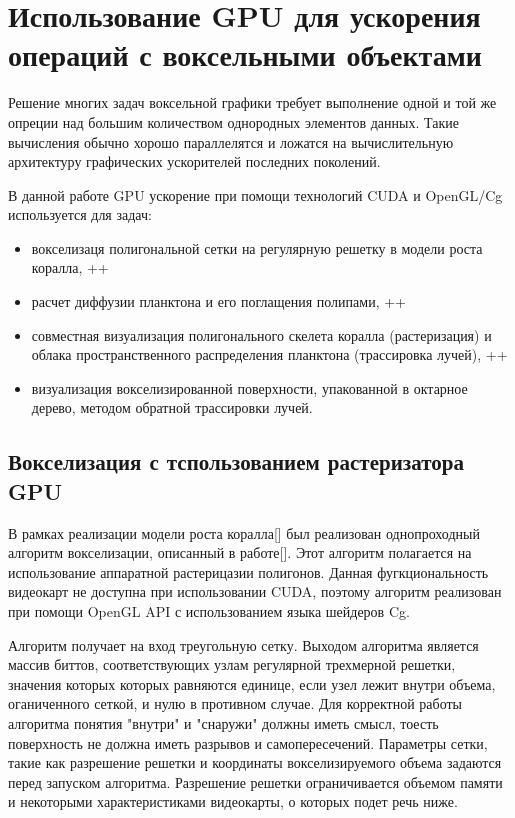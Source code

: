\section{Использование GPU для ускорения операций с воксельными объектами}

Решение многих задач воксельной графики требует выполнение одной и той же опреции над большим количеством однородных элементов данных. Такие вычисления обычно хорошо параллелятся и ложатся на вычислительную архитектуру графических ускорителей последних поколений.

В данной работе GPU ускорение при помощи технологий CUDA и OpenGL/Cg используется для задач:
\begin{itemize}
\item вокселизаця полигональной сетки на регулярную решетку в модели роста коралла, ++
\item расчет диффузии планктона и его поглащения полипами, ++
\item совместная визуализация полигонального скелета коралла (растеризация) и облака пространственного распределения планктона (трассировка лучей), ++
\item визуализация вокселизированной поверхности, упакованной в октарное дерево, методом обратной трассировки лучей.
\end{itemize}

\subsection{Вокселизация с тспользованием растеризатора GPU}
В рамках реализации модели роста коралла[] был реализован однопроходный алгоритм вокселизации, описанный в работе[]. Этот алгоритм полагается на использование аппаратной растерицазии полигонов. Данная фугкциональность видеокарт не доступна при использовании CUDA, поэтому алгоритм реализован при помощи OpenGL API с использованием языка шейдеров Cg.

Алгоритм получает на вход треугольную сетку. Выходом алгоритма является массив биттов, соответствующих узлам регулярной трехмерной решетки, значения которых которых равняются единице, если узел лежит внутри объема, оганиченного сеткой, и нулю в противном случае. Для корректной работы алгоритма понятия "внутри" и "снаружи" должны иметь смысл, тоесть поверхность не должна иметь разрывов и самопересечений. Параметры сетки, такие как разрешение решетки и координаты вокселизируемого объема задаются перед запуском алгоритма. Разрешение решетки ограничивается объемом памяти и некоторыми характеристиками видеокарты, о которых подет речь ниже.


